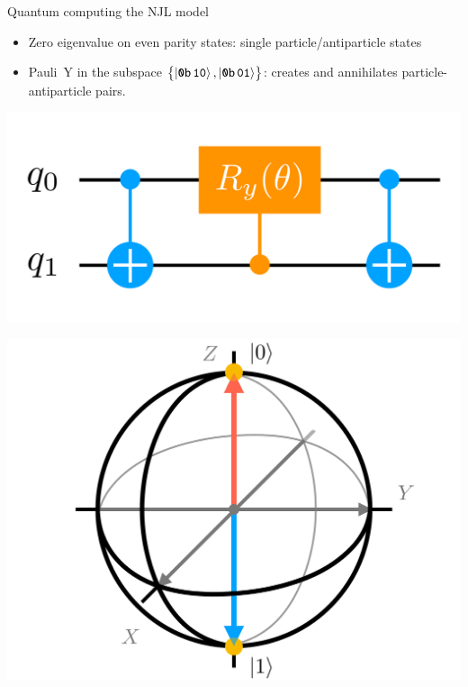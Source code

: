 \begin{frame}[allowframebreaks]{Quantum computing the NJL model}
\begin{multicols}{2}
    \begin{itemize}
      \item Zero eigenvalue on even parity states: single particle/antiparticle states
      \item Pauli~Y in the subspace $\qty{\ket{\bin 10}, \ket{\bin 01}}$: creates and annihilates particle-antiparticle pairs.
    \end{itemize}

  \columnbreak

    \begin{center}
      \includegraphics[width=.25\paperwidth]{Figures/chapter06/xy-rotation}
    \end{center}

    \begin{center}
      \includegraphics[width=.25\paperwidth]{Figures/chapter01/bloch-sphere}
    \end{center}

  \end{multicols}


\end{frame}

